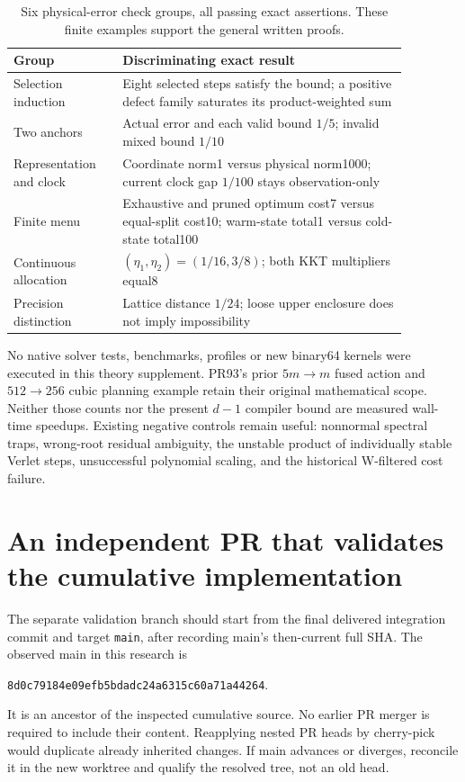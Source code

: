 \documentclass[aps,pra,reprint,onecolumn,10pt,notitlepage,nofootinbib]{revtex4-2}
\begin{document}
\begin{table}[h]
\caption{Six physical-error check groups, all passing exact assertions.
These finite examples support the general written proofs.}
\begin{tabular}{L{0.24\linewidth}L{0.63\linewidth}}
\toprule
Group & Discriminating exact result\\
\midrule
Selection induction & Eight selected steps satisfy the bound; a positive
defect family saturates its product-weighted sum\\
Two anchors & Actual error and each valid bound $1/5$; invalid mixed bound $1/10$\\
Representation and clock & Coordinate norm1 versus physical norm1000;
current clock gap $1/100$ stays observation-only\\
Finite menu & Exhaustive and pruned optimum cost7 versus equal-split cost10;
warm-state total1 versus cold-state total100\\
Continuous allocation & $(\eta_1,\eta_2)=(1/16,3/8)$; both KKT multipliers equal8\\
Precision distinction & Lattice distance $1/24$; loose upper enclosure
does not imply impossibility\\
\bottomrule
\end{tabular}
\end{table}

No native solver tests, benchmarks, profiles or new binary64 kernels were
executed in this theory supplement. PR93's prior $5m\to m$ fused action and
$512\to256$ cubic planning example retain their original mathematical scope.
Neither those counts nor the present $d-1$ compiler bound are measured
wall-time speedups. Existing negative controls remain useful: nonnormal
spectral traps, wrong-root residual ambiguity, the unstable product of
individually stable Verlet steps, unsuccessful polynomial scaling, and the
historical W-filtered cost failure.

\section{An independent PR that validates the cumulative implementation}

The separate validation branch should start from the final delivered integration
commit and target \texttt{main}, after recording main's then-current full SHA.
The observed main in this research is
\par\noindent\texttt{8d0c79184e09efb5bdadc24a6315c60a71a44264}.
\par It is an ancestor of the inspected cumulative source. No earlier PR merger
is required to include their content. Reapplying nested PR heads by cherry-pick
would duplicate already inherited changes. If main advances or diverges,
reconcile it in the new worktree and qualify the resolved tree, not an old head.
\end{document}
